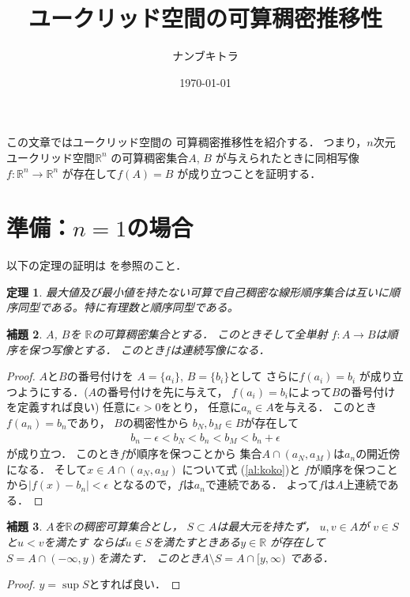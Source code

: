 \documentclass[leqno, a4paper, 12pt]{jsarticle}
\title{ユークリッド空間の可算稠密推移性}
\author{ナンブキトラ}
\date{\today}
\newtheorem{thm}{定理}
\newtheorem{lem}[thm]{補題}
\newcommand{\rr}{\mathbb{R}}
\begin{document}
\maketitle
この文章ではユークリッド空間の
可算稠密推移性を紹介する．
つまり，$n$次元ユークリッド空間$\rr^{n}$
の可算稠密集合$A$, $B$
が与えられたときに同相写像$f: \rr^{n}\to \rr^{n}$
が存在して$f(A)=B$
が成り立つことを証明する．

\section{準備：$n=1$の場合}
以下の定理の証明は \cite{denq}を参照のこと．
\begin{thm}\label{thm:qqq}
最大値及び最小値を持たない可算で自己稠密な線形順序集合は互いに順序同型である。特に有理数と順序同型である。
\end{thm}



\begin{lem}
$A$, $B$を
$\rr$の可算稠密集合とする．
このときそして全単射
$f: A\to B$は順序を保つ写像とする．
このとき$f$は連続写像になる．
\end{lem}
\begin{proof}
$A$と$B$の番号付けを
$A=\{a_{i}\}$, 
$B=\{b_{i}\}$として
さらに$f(a_{i})=b_{i}$
が成り立つようにする．($A$の番号付けを先に与えて，
$f(a_{i})=b_{i}$によって$B$の番号付けを定義すれば良い)
任意に$\epsilon>0$をとり，
任意に$a_{n}\in A$を与える．
このとき$f(a_{n})=b_{n}$であり，
$B$の稠密性から
$b_{N}, b_{M}\in B$が存在して
\begin{align}\label{al:koko}
b_{n}-\epsilon<b_{N}<b_{n}<b_{M}<b_{n}+\epsilon
\end{align}
が成り立つ．
このとき$f$が順序を保つことから
集合$A\cap (a_{N}, a_{M})$は$a_{n}$の開近傍
になる．
そして$x\in A\cap (a_{N}, a_{M})$
について式 (\ref{al:koko})と
$f$が順序を保つことから$|f(x)-b_{n}|<\epsilon$
となるので，$f$は$a_{n}$で連続である．
よって$f$は$A$上連続である．
\end{proof}

\begin{lem}
$A$を$\rr$の稠密可算集合とし，
$S\subset A$は最大元を持たず，
$u, v\in A$が
$v\in S$と$u<v$を満たす
ならば$u\in S$を満たすときある$y\in \rr$
が存在して
$S=A\cap (-\infty, y)$を満たす．
このとき$A\setminus S=A\cap [y, \infty)$
である．
\end{lem}
\begin{proof}
$y=\sup S$とすれば良い．
\end{proof}
\end{document}
